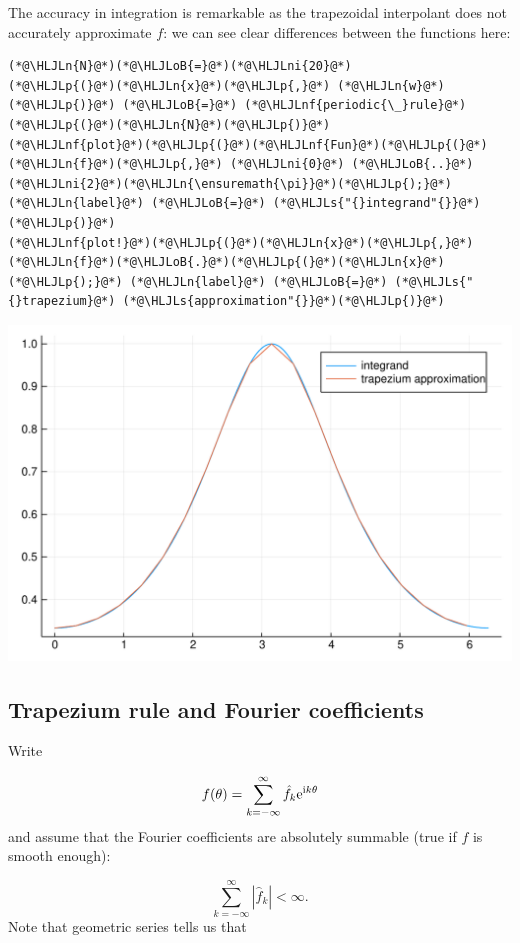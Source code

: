 \documentclass[12pt,a4paper]{article}
\newcommand{\HLJLn}[1]{#1}
\newcommand{\HLJLnf}[1]{\textcolor[RGB]{66,102,213}{#1}}
\newcommand{\HLJLs}[1]{\textcolor[RGB]{201,61,57}{#1}}
\newcommand{\HLJLni}[1]{\textcolor[RGB]{59,151,46}{#1}}
\newcommand{\HLJLoB}[1]{\textcolor[RGB]{102,102,102}{\textbf{#1}}}
\newcommand{\HLJLp}[1]{#1}
\def\I{ {\rm i} }
\def\E{ {\rm e} }
\begin{document}
The accuracy in integration is remarkable as the trapezoidal interpolant does not accurately approximate $f$: we can see  clear differences between the functions here:


\begin{lstlisting}
(*@\HLJLn{N}@*)(*@\HLJLoB{=}@*)(*@\HLJLni{20}@*)
(*@\HLJLp{(}@*)(*@\HLJLn{x}@*)(*@\HLJLp{,}@*) (*@\HLJLn{w}@*)(*@\HLJLp{)}@*) (*@\HLJLoB{=}@*) (*@\HLJLnf{periodic{\_}rule}@*)(*@\HLJLp{(}@*)(*@\HLJLn{N}@*)(*@\HLJLp{)}@*)
(*@\HLJLnf{plot}@*)(*@\HLJLp{(}@*)(*@\HLJLnf{Fun}@*)(*@\HLJLp{(}@*)(*@\HLJLn{f}@*)(*@\HLJLp{,}@*) (*@\HLJLni{0}@*) (*@\HLJLoB{..}@*) (*@\HLJLni{2}@*)(*@\HLJLn{\ensuremath{\pi}}@*)(*@\HLJLp{);}@*) (*@\HLJLn{label}@*) (*@\HLJLoB{=}@*) (*@\HLJLs{"{}integrand"{}}@*)(*@\HLJLp{)}@*)
(*@\HLJLnf{plot!}@*)(*@\HLJLp{(}@*)(*@\HLJLn{x}@*)(*@\HLJLp{,}@*) (*@\HLJLn{f}@*)(*@\HLJLoB{.}@*)(*@\HLJLp{(}@*)(*@\HLJLn{x}@*)(*@\HLJLp{);}@*) (*@\HLJLn{label}@*) (*@\HLJLoB{=}@*) (*@\HLJLs{"{}trapezium}@*) (*@\HLJLs{approximation"{}}@*)(*@\HLJLp{)}@*)
\end{lstlisting}

\includegraphics[width=\linewidth]{figures/Lecture6_2_1.pdf}

\subsection{Trapezium rule and Fourier coefficients}
Write

\[
f(\theta) = \sum_{k=-\infty}^\infty \hat f_k \E^{\I k \theta}
\]
and assume that the Fourier coefficients are absolutely summable (true if $f$ is smooth enough): 

\[
\sum_{k=-\infty}^\infty |\hat f_k| < \infty.
\]
Note that geometric series tells us that 
\end{document}
